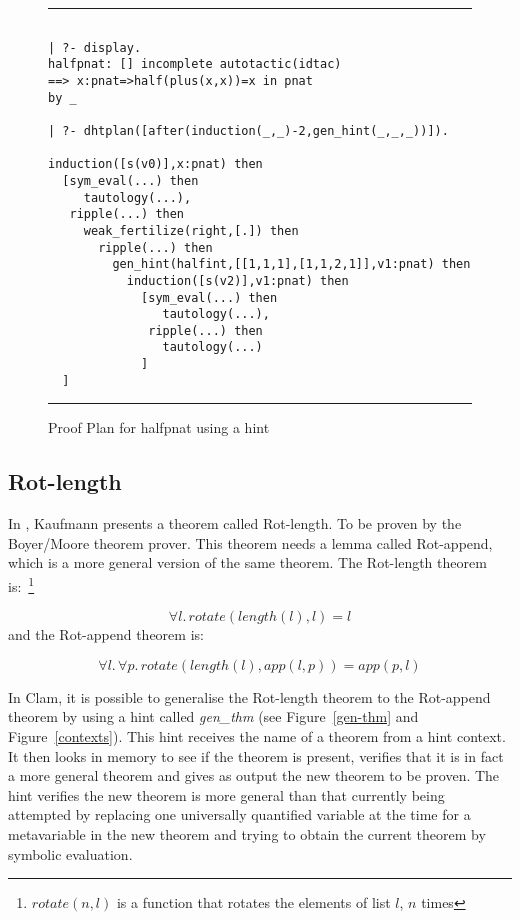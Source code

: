 \begin{figure}[htb] \begin{center} %
\hrule
\begin{small}
\begin{verbatim}

| ?- display.
halfpnat: [] incomplete autotactic(idtac)
==> x:pnat=>half(plus(x,x))=x in pnat
by _

| ?- dhtplan([after(induction(_,_)-2,gen_hint(_,_,_))]).

induction([s(v0)],x:pnat) then
  [sym_eval(...) then
     tautology(...),
   ripple(...) then
     weak_fertilize(right,[.]) then
       ripple(...) then
         gen_hint(halfint,[[1,1,1],[1,1,2,1]],v1:pnat) then
           induction([s(v2)],v1:pnat) then
             [sym_eval(...) then
                tautology(...),
              ripple(...) then
                tautology(...)
             ]
  ]

\end{verbatim}
\end{small}
\end{center}
\caption{Proof Plan for halfpnat using a hint}
\label{halfpnat-plan}
\hrule
\end{figure}


\subsection{Rot-length}

        In \cite{Kaufmann}, Kaufmann presents a theorem called
Rot-length. To be proven by the Boyer/Moore theorem prover. This
theorem needs a lemma called Rot-append, which is a more general
version of the same theorem. The Rot-length theorem
is:~\footnote{$rotate(n,l)$ is a function that rotates the elements of
list $l$, $n$ times}

\begin{equation}
\label{rot-length}
\forall l.\, rotate(length(l),l)=l
\end{equation} 
and the Rot-append theorem is:

\begin{equation}
\label{rot-append}
\forall l.\, \forall p.\, rotate(length(l),app(l,p))=app(p,l)
\end{equation}


        In Clam, it is possible to generalise the Rot-length theorem to
the Rot-append theorem by using a hint called {\em gen\_thm} (see
Figure~\ref{gen-thm} and Figure~\ref{contexts}). This hint receives the
name of a theorem from a hint context. It then looks in memory to see if
the theorem is present, verifies that it is in fact a more general
theorem and gives as output the new theorem to be proven. The hint
verifies the new theorem is more general than that currently being
attempted by replacing one universally quantified variable at the time
for a metavariable in the new theorem and trying to obtain the current
theorem by symbolic evaluation.

